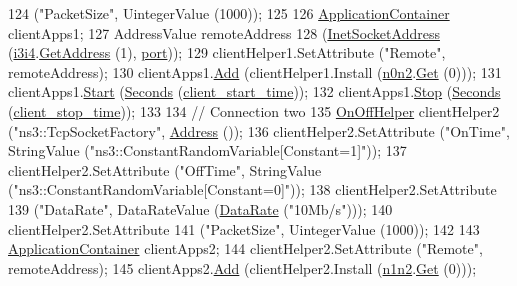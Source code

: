 \begin{DoxyCode}
124         (\textcolor{stringliteral}{"PacketSize"}, UintegerValue (1000));
125 
126       \hyperlink{classns3_1_1ApplicationContainer}{ApplicationContainer} clientApps1;
127       AddressValue remoteAddress
128         (\hyperlink{classns3_1_1InetSocketAddress}{InetSocketAddress} (\hyperlink{red-tests_8cc_ae521eb38559954aa9357fa662c3bb76e}{i3i4}.\hyperlink{classns3_1_1Ipv4InterfaceContainer_ae63208dcd222be986822937ee4aa828c}{GetAddress} (1), 
      \hyperlink{dsdv-manet_8cc_a8e0798404bf2cf5dabb84c5ba9a4f236}{port}));
129       clientHelper1.SetAttribute (\textcolor{stringliteral}{"Remote"}, remoteAddress);
130       clientApps1.\hyperlink{classns3_1_1ApplicationContainer_ad09ab1a1ad5849d518d5f4c262e38152}{Add} (clientHelper1.Install (\hyperlink{red-tests_8cc_aeaa87dbd052b50719525adea0f586b36}{n0n2}.\hyperlink{classns3_1_1NodeContainer_a9ed96e2ecc22e0f5a3d4842eb9bf90bf}{Get} (0)));
131       clientApps1.\hyperlink{classns3_1_1ApplicationContainer_a8eff87926507020bbe3e1390358a54a7}{Start} (\hyperlink{group__timecivil_ga33c34b816f8ff6628e33d5c8e9713b9e}{Seconds} (\hyperlink{red-tests_8cc_a18ff86acaf663200fbedb1f77d03b515}{client\_start\_time}));
132       clientApps1.\hyperlink{classns3_1_1ApplicationContainer_adfc52f9aa4020c8714679b00bbb9ddb3}{Stop} (\hyperlink{group__timecivil_ga33c34b816f8ff6628e33d5c8e9713b9e}{Seconds} (\hyperlink{red-tests_8cc_aee714f5dcf74da2f73bcdd66c8a9e265}{client\_stop\_time}));
133 
134       \textcolor{comment}{// Connection two}
135       \hyperlink{classns3_1_1OnOffHelper}{OnOffHelper} clientHelper2 (\textcolor{stringliteral}{"ns3::TcpSocketFactory"}, \hyperlink{classns3_1_1Address}{Address} ());
136       clientHelper2.SetAttribute (\textcolor{stringliteral}{"OnTime"}, StringValue (\textcolor{stringliteral}{"ns3::ConstantRandomVariable[Constant=1]"}));
137       clientHelper2.SetAttribute (\textcolor{stringliteral}{"OffTime"}, StringValue (\textcolor{stringliteral}{"ns3::ConstantRandomVariable[Constant=0]"}));
138       clientHelper2.SetAttribute 
139         (\textcolor{stringliteral}{"DataRate"}, DataRateValue (\hyperlink{classns3_1_1DataRate}{DataRate} (\textcolor{stringliteral}{"10Mb/s"})));
140       clientHelper2.SetAttribute 
141         (\textcolor{stringliteral}{"PacketSize"}, UintegerValue (1000));
142 
143       \hyperlink{classns3_1_1ApplicationContainer}{ApplicationContainer} clientApps2;
144       clientHelper2.SetAttribute (\textcolor{stringliteral}{"Remote"}, remoteAddress);
145       clientApps2.\hyperlink{classns3_1_1ApplicationContainer_ad09ab1a1ad5849d518d5f4c262e38152}{Add} (clientHelper2.Install (\hyperlink{red-tests_8cc_a68f69f65725cbe7529e8b594708b8fc0}{n1n2}.\hyperlink{classns3_1_1NodeContainer_a9ed96e2ecc22e0f5a3d4842eb9bf90bf}{Get} (0)));

\end{DoxyCode}
